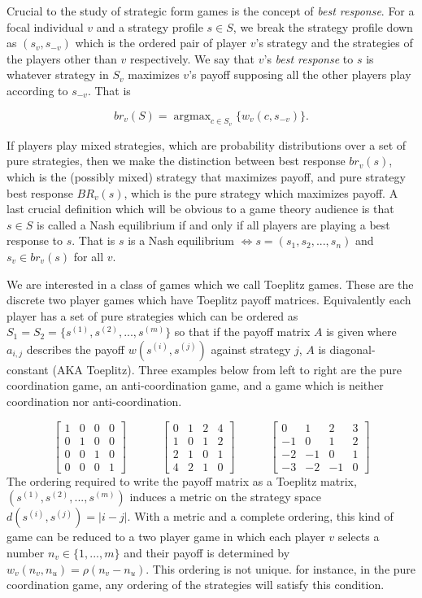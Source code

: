 \documentclass[aps,
preprint,
groupedaddress,
showkeys,
amsmath]{revtex4-2}
\DeclareMathOperator*{\argmax}{\text{argmax}}
\begin{document}
Crucial to the study of strategic form games is the concept of\textit{ best response}. For a focal individual $v$ and a strategy profile $s\in S$, we break the strategy profile down as $(s_v,s_{-v})$ which is the ordered pair of player $v$'s strategy and the strategies of the players other than $v$ respectively. We say that $v$'s \textit{best response} to $s$ is whatever strategy in $S_v$ maximizes $v$'s payoff supposing all the other players play according to $s_{-v}$. That is

\[ br_v(S)=\argmax_{c\in S_v}\{w_v(c,s_{-v})\}.\]

If players play mixed strategies, which are probability distributions over a set of pure strategies, then we make the distinction between best response $br_v(s)$, which is the (possibly mixed) strategy that maximizes payoff, and pure strategy best response $BR_v(s)$, which is the pure strategy which maximizes payoff. A last crucial definition which will be obvious to a game theory audience is that $s\in S$ is called a Nash equilibrium if and only if all players are playing a best response to $s$. That is $s$ is a Nash equilibrium $\iff s=(s_1,s_2,...,s_n)$ and $s_v\in br_v(s)$ for all $v$.

We are interested in a class of games which we call Toeplitz games. These are the discrete two player games which have Toeplitz payoff matrices. Equivalently each player has a set of pure strategies which can be ordered as $S_1=S_2=\{s^{(1)},s^{(2)},...,s^{(m)}\}$ so that if the payoff  matrix $A$ is given where $a_{i,j}$ describes the payoff $w(s^{(i)},s^{(j)})$ against strategy $j$, $A$ is diagonal-constant (AKA Toeplitz). Three examples below from left to right are the pure coordination game, an anti-coordination game, and a game which is neither coordination nor anti-coordination. 

\[\begin{bmatrix}
    1&0&0&0\\0&1&0&0\\0&0&1&0\\0&0&0&1
\end{bmatrix}
\quad\quad\quad
\begin{bmatrix}
    0&1&2&4\\
    1&0&1&2\\
    2&1&0&1\\
    4&2&1&0
\end{bmatrix}
\quad\quad\quad 
\begin{bmatrix}
    0&1&2&3\\
    -1&0&1&2\\
    -2&-1&0&1\\
    -3&-2&-1&0
\end{bmatrix}\]
The ordering required to write the payoff matrix as a Toeplitz matrix, $(s^{(1)},s^{(2)},...,s^{(m)})$ induces a metric on the strategy space $d(s^{(i)},s^{(j)})=|i-j|$. With a metric and a complete ordering, this kind of game can be reduced to a two player game in which each player $v$ selects a number $n_v\in\{1,...,m\}$ and their payoff is determined by $w_v(n_v,n_u)=\rho(n_v-n_u)$. This ordering is not unique. for instance, in the pure coordination game, any ordering of the strategies will satisfy this condition. 
\end{document}
